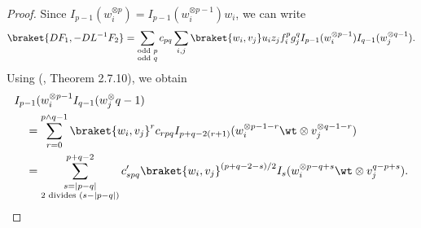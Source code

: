 \begin{proof}
    Since \(I_{p - 1} (w_i^{\otimes p}) = I_{p - 1}(w_i^{\otimes p - 1}) w_i\), we can write
    \begin{equation}
        \braket{D F_1, -DL^{-1} F_2} = \sum_{\substack{\text{odd } p \\ {\text{odd } q}}} c_{pq} \sum_{i, j} \braket{w_i, v_j} u_i z_j f_i^p g_j^q I_{p - 1}(w_i^{\otimes p - 1}) I_{q - 1}(w_j^{\otimes q - 1}).
    \end{equation}
    Using (\cite{nourdin2012normal}, Theorem 2.7.10), we obtain
    \begin{equation}
    \begin{aligned}
        & I_{p - 1}(w_i^{\otimes p - 1} I_{q - 1}(w_j^\otimes q - 1) \\
        & \quad = \sum_{r = 0}^{p \land q - 1} \braket{w_i, v_j}^r c_{rpq} I_{p + q - 2(r + 1)} (w_i^{\otimes p - 1 - r} \wt \otimes v_j^{\otimes q - 1 - r}) \\
        & \quad = \sum_{\substack{s = |p - q| \\ 2 \text{ divides } (s - |p - q|)}}^{p + q - 2} c'_{spq} \braket{w_i, v_j} ^{(p + q - 2 - s) / 2} I_s(w_i^{\otimes p - q + s} \wt \otimes v_j^{q - p + s}).
    \end{aligned}
    \end{equation}


\end{proof}
